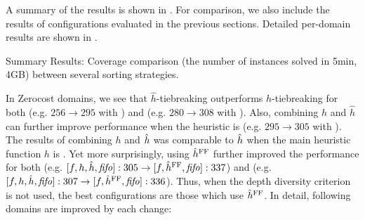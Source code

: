 
A summary of the results is shown in . For
comparison, we also include the results of configurations evaluated in the previous sections.
Detailed per-domain results are shown in
.

\begin{table}[htbp]
 \centering
 
 \caption{
 Summary Results: Coverage comparison (the number
 of instances solved in 5min, 4GB) between several sorting strategies.
 }
 \label{tbl:dtg-summary}
\end{table}

In Zerocost domains, we see that $\hat{h}$-tiebreaking outperforms $h$-tiebreaking for both \lmcut (e.g. $256\rightarrow 295$ with \fifo) and \mands (e.g. $280\rightarrow 308$ with \fifo).
Also, combining $h$ and $\hat{h}$ can further improve performance when the heuristic is \lmcut (e.g. $295\rightarrow 305$ with \fifo).
The results of combining $h$ and $\hat{h}$ was comparable to $\hat{h}$ when the main heuristic function $h$ is \mands.
% 
Yet more surprisingly, using $\hat{h}^{\text{FF}}$ further improved the performance for both \lmcut
(e.g. $[f,h,\hat{h},{\text{\textit{fifo}}}]:305 \rightarrow [f,\hat{h}^{\text{FF}},{\text{\textit{fifo}}}]:337$) and \mands 
(e.g. $[f,h,\hat{h},{\text{\textit{fifo}}}]:307 \rightarrow [f,\hat{h}^{\text{FF}},{\text{\textit{fifo}}}]:336$).
% 
Thus, when the depth diversity criterion  is not used, the best configurations are those
which use $\hat{h}^{\text{FF}}$.
In detail, following domains are improved by each change:
